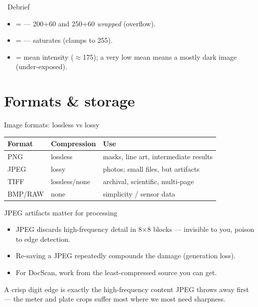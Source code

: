 \documentclass[10pt,aspectratio=169]{beamer}
\begin{document}
\begin{frame}{\faPen~Debrief}
  \begin{itemize}
    \item {} = \code{[[160,210],[4,54]]} — 200+60 and 250+60 \emph{wrapped} (overflow).
    \item {} = \code{[[160,210],[255,255]]} —  saturates (clamps to 255).
    \item {} = mean intensity ($\approx$175); a very low mean means a mostly dark image (under-exposed).
  \end{itemize}
\end{frame}

\section{Formats \& storage}

\begin{frame}{Image formats: lossless vs lossy}
  \begin{center}
  \begin{tabular}{@{}lll@{}}
    \toprule
    \textbf{Format} & \textbf{Compression} & \textbf{Use} \\
    \midrule
    PNG & lossless & masks, line art, intermediate results \\
    JPEG & lossy & photos; small files, but artifacts \\
    TIFF & lossless/none & archival, scientific, multi-page \\
    BMP/RAW & none & simplicity / sensor data \\
    \bottomrule
  \end{tabular}
  \end{center}
\end{frame}

\begin{frame}{JPEG artifacts matter for processing}
  \begin{itemize}
    \item JPEG discards high-frequency detail in 8$\times$8 blocks — invisible to you, poison to edge detection.
    \item Re-saving a JPEG repeatedly compounds the damage (generation loss).
    \item For DocScan, work from the least-compressed source you can get.
  \end{itemize}
  \begin{infobox}
    A crisp digit edge is exactly the high-frequency content JPEG throws away first —
    the meter and plate crops suffer most where we most need sharpness.
  \end{infobox}
\end{frame}
\end{document}
